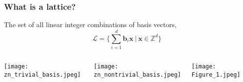 \documentclass[
aspectratio=169, %
t, %
onlytextwidth, %
10pt, %
]{beamer}
\begin{document}
\begin{frame}
    \frametitle{What is a lattice?}

    \begin{adjustwidth}{0cm}{0cm} %

        \begin{tcolorbox}[colback=ICLBlue!5!white,colframe=ICLBlue,title=\textbf{Definition:} Lattice]
            The set of all linear integer combinations of basis vectors,
            \[
                \mathcal{L} = \{ \sum_{i = 1}^{d}\mathbf{b}_i\mathbf{x} \ | \ \mathbf{x} \in \mathbb{Z}^d \}
            \]
        \end{tcolorbox}

        \vspace{-0.5em}
        \begin{columns}[T] %
            \begin{column}{0.3\linewidth} %
                \texttt{[image: zn\_trivial\_basis.jpeg]}
            \end{column}
            \begin{column}{0.3\linewidth} %
                \texttt{[image: zn\_nontrivial\_basis.jpeg]}
            \end{column}
            \begin{column}{0.3\linewidth} %
                \texttt{[image: Figure\_1.jpeg]}
            \end{column}
        \end{columns}
    \end{adjustwidth}
\end{frame}

\end{document}
